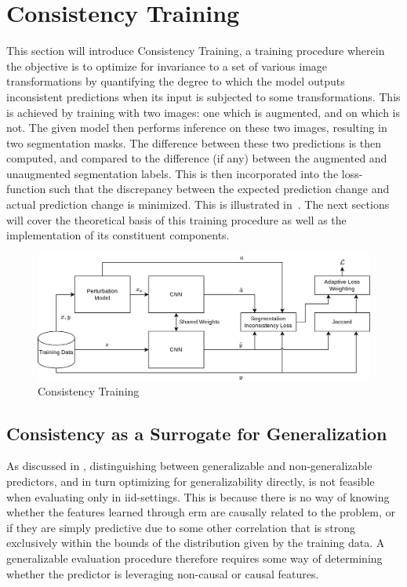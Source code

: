 \section{Consistency Training}
This section will introduce Consistency Training, a training procedure wherein the objective is to optimize for invariance to a set of various image transformations by quantifying the degree to which the model outputs inconsistent predictions when its input is subjected to some transformations. This is achieved by training with two images: one which is augmented, and on which is not. The given model then performs inference on these two images, resulting in two segmentation masks. The difference between these two predictions is then computed, and compared to the difference (if any) between the augmented and unaugmented segmentation labels. This is then incorporated into the loss-function such that the discrepancy between the expected prediction change and actual prediction change is minimized. This is illustrated in~. The next sections will cover the theoretical basis of this training procedure as well as the implementation of its constituent components.  

\begin{figure}[htb]
    \centering
    \includegraphics[width=\linewidth]{illustrations/consistency_training.png}
    \caption{Consistency Training}
    \label{fig:consistency_training}
\end{figure}


\subsection{Consistency as a Surrogate for Generalization}\label{consistency_conceptual}
As discussed in , distinguishing between generalizable and non-generalizable predictors, and in turn optimizing for generalizability directly, is not feasible when evaluating only in iid-settings. This is because there is no way of knowing whether the features learned through \gls{erm} are causally related to the problem, or if they are simply predictive due to some other correlation that is strong exclusively within the bounds of the distribution given by the training data. A generalizable evaluation procedure therefore requires some way of determining whether the predictor is leveraging non-causal or causal features. 

